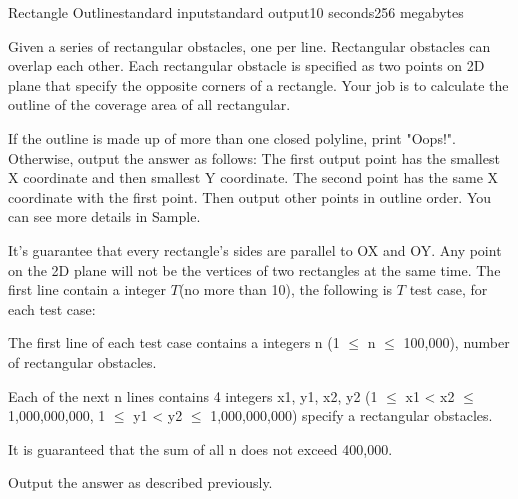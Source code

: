 \begin{problem}{Rectangle Outline}{standard input}{standard output}{10 seconds}{256 megabytes}

Given a series of rectangular obstacles, one per line. Rectangular obstacles can overlap each other. Each rectangular obstacle is specified as two points on 2D plane that specify the opposite corners of a rectangle. Your job is to calculate the outline of the coverage area of all rectangular.

If the outline is made up of more than one closed polyline, print "Oops!". Otherwise, output the answer as follows: The first output point has the smallest X coordinate and then smallest Y coordinate. The second point has the same X coordinate with the first point. Then output other points in outline order. You can see more details in Sample.

It's guarantee that every rectangle's sides are parallel to OX and OY. Any point on the 2D plane will not be the vertices of two rectangles at the same time. 
\InputFile
The first line contain a integer $T$(no more than 10), the following is $T$ test case, for each test case:

The first line of each test case contains a integers n (1 $\le$ n $\le$ 100,000), number of rectangular obstacles. 

Each of the next n lines contains 4 integers x1, y1, x2, y2 (1 $\le$ x1 < x2 $\le$ 1,000,000,000, 1 $\le$ y1 < y2 $\le$ 1,000,000,000) specify a rectangular obstacles. 

It is guaranteed that the sum of all n does not exceed 400,000.


\OutputFile
Output the answer as described previously.

\Examples

\begin{example}
%
%
%
\end{example}

\end{problem}

